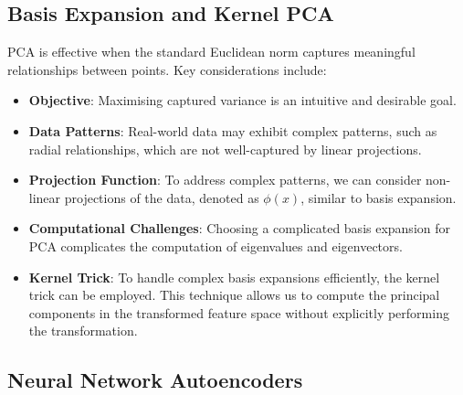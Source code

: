 \subsection{Basis Expansion and Kernel PCA}

PCA is effective when the standard Euclidean norm captures meaningful relationships between points. Key considerations include:
\begin{itemize}
    \item \textbf{Objective}: Maximising captured variance is an intuitive and desirable goal.
    \item \textbf{Data Patterns}: Real-world data may exhibit complex patterns, such as radial relationships, which are not well-captured by linear projections.
    \item \textbf{Projection Function}: To address complex patterns, we can consider non-linear projections of the data, denoted as $\phi(x)$, similar to basis expansion.
    \item \textbf{Computational Challenges}: Choosing a complicated basis expansion for PCA complicates the computation of eigenvalues and eigenvectors.
    \item \textbf{Kernel Trick}: To handle complex basis expansions efficiently, the kernel trick can be employed. This technique allows us to compute the principal components in the transformed feature space without explicitly performing the transformation.
\end{itemize}

\subsection{Neural Network Autoencoders}

